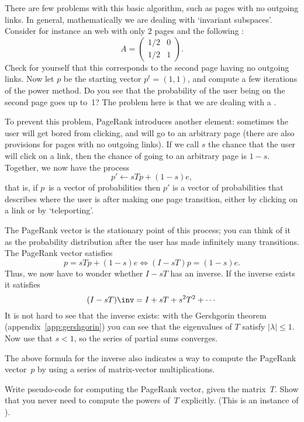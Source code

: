 There are few problems with this basic algorithm, such as
pages with no outgoing links. In general, mathematically we are
dealing with `invariant subspaces'. Consider for
instance an web with only 2 pages and the following
:
\[ A=
\begin{pmatrix}
  1/2&0\\ 1/2&1
\end{pmatrix}.
\]
Check for yourself that this corresponds to the second page having no
outgoing links. Now let $p$ be the starting vector $p^t=(1,1)$, and
compute a few iterations of the power method. Do you see that the
probability of the user being on the second page goes up to~1? The
problem here is that we are dealing with a
.

To prevent this problem, PageRank
introduces another element: sometimes the user
will get bored from clicking, and will go to an arbitrary page (there
are also provisions for pages with no outgoing links). If we
call $s$ the chance that the user will click on a link, then the
chance of going to an arbitrary page is $1-s$. Together, we now have
the process
\[ p'\leftarrow sTp+(1-s)e, \]
that is, if $p$~is a vector of probabilities then $p'$ is a vector of
probabilities that describes where the user is after making one page
transition, either by clicking on a link or by `teleporting'.

The PageRank vector is the stationary point of this process; you can
think of it as the probability distribution after the user has made
infinitely many transitions. The PageRank vector satisfies
\[ p=sTp+(1-s)e \Leftrightarrow (I-sT)p=(1-s)e. \]
Thus, we now have to wonder whether $I-sT$ has an inverse.
If the inverse exists it satisfies
\[ (I-sT)\inv = I+sT+s^2T^2+\cdots \]
It is not hard to see that the inverse exists: with the Gershgorin theorem
(appendix~\ref{app:gershgorin}) you can see that the eigenvalues of
$T$ satisfy $|\lambda|\leq 1$. Now use that $s<1$, so the series of
partial sums converges.

The above formula for the inverse also indicates a way to compute the
PageRank vector~$p$ by using a series of matrix-vector
multiplications.

\begin{exercise}
  Write pseudo-code for computing the PageRank vector, given the
  matrix~$T$. Show that you never need to compute the powers of~$T$
  explicitly. (This is an instance of ).
\end{exercise}

